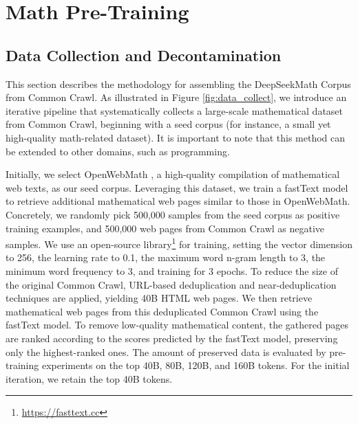 \section{Math Pre-Training}

\subsection{Data Collection and Decontamination} This section describes the methodology for assembling the DeepSeekMath Corpus from Common Crawl. As illustrated in Figure \ref{fig:data_collect}, we introduce an iterative pipeline that systematically collects a large-scale mathematical dataset from Common Crawl, beginning with a seed corpus (for instance, a small yet high-quality math-related dataset). It is important to note that this method can be extended to other domains, such as programming.

Initially, we select OpenWebMath \citep{openwebmath}, a high-quality compilation of mathematical web texts, as our seed corpus. Leveraging this dataset, we train a fastText model \citep{joulin2016fasttext} to retrieve additional mathematical web pages similar to those in OpenWebMath. Concretely, we randomly pick 500,000 samples from the seed corpus as positive training examples, and 500,000 web pages from Common Crawl as negative samples. We use an open-source library\footnote{\url{https://fasttext.cc}} for training, setting the vector dimension to 256, the learning rate to 0.1, the maximum word n-gram length to 3, the minimum word frequency to 3, and training for 3 epochs. To reduce the size of the original Common Crawl, URL-based deduplication and near-deduplication techniques are applied, yielding 40B HTML web pages. We then retrieve mathematical web pages from this deduplicated Common Crawl using the fastText model. To remove low-quality mathematical content, the gathered pages are ranked according to the scores predicted by the fastText model, preserving only the highest-ranked ones. The amount of preserved data is evaluated by pre-training experiments on the top 40B, 80B, 120B, and 160B tokens. For the initial iteration, we retain the top 40B tokens.


